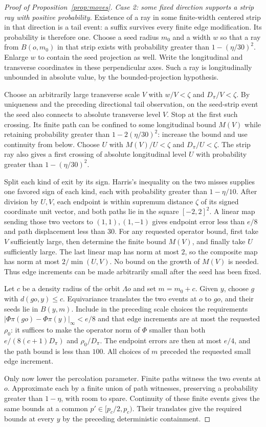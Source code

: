 \documentclass[11pt]{article}
\theoremstyle{definition}
\begin{document}
\begin{proof}[Proof of Proposition~\ref{prop:moves}]
\emph{Case 2: some fixed direction supports a strip ray with positive
probability.} Existence of a ray in some finite-width centered strip
in that direction is a tail event: a suffix survives every finite
edge modification. Its probability is therefore one. Choose a seed
radius $m_0$ and a width $w$ so that a ray from $B(o,m_0)$ in that
strip exists with probability greater than $1-(\eta/30)^2$.
Enlarge $w$ to contain the seed projection as well. Write the
longitudinal and transverse coordinates in these perpendicular axes.
Such a ray is longitudinally unbounded in absolute value, by the
bounded-projection hypothesis.

Choose an arbitrarily large transverse scale $V$ with
$w/V<\zeta$ and $D_\pi/V<\zeta$.
By uniqueness and the preceding directional tail observation, on
the seed-strip event the seed also connects to absolute transverse
level $V$. Stop at the first such crossing. Its finite path can be
confined to some longitudinal bound $M(V)$ while retaining probability
greater than $1-2(\eta/30)^2$: increase the bound and use continuity
from below. Choose $U$ with $M(V)/U<\zeta$ and $D_\pi/U<\zeta$.
The strip ray also gives a
first crossing of absolute longitudinal level $U$ with probability
greater than $1-(\eta/30)^2$.

Split each kind of exit by its sign. Harris's inequality on the two
misses supplies one favored sign of each kind, each with probability
greater than $1-\eta/10$. After division by $U,V$, each endpoint is
within supremum distance $\zeta$ of its signed coordinate unit vector,
and both paths lie in the square $[-2,2]^2$.
A linear map sending those two vectors to $(1,1),(1,-1)$ gives
endpoint error less than $e/8$ and path displacement less than $30$.
For any requested operator bound, first take $V$ sufficiently large,
then determine the finite bound $M(V)$, and finally take $U$ sufficiently
large. The last linear map has norm at most $2$, so the composite map
has norm at most $2/\min(U,V)$. No bound on the growth of $M(V)$ is
needed. Thus edge increments can be made arbitrarily small after
the seed has been fixed.

Let $c$ be a density radius of the orbit $\Lambda o$ and set
$m=m_0+c$. Given $y$, choose $g$ with $d(go,y)\le c$.
Equivariance translates the two events at $o$ to $go$, and their seeds
lie in $B(y,m)$. Include in the preceding scale choices the requirements
$|\Phi\pi(go)-\Phi\pi(y)|_\infty<e/8$ and that edge increments
are at most the requested $\rho_0$: it suffices to make the operator norm
of $\Phi$ smaller than both $e/(8(c+1)D_\pi)$ and $\rho_0/D_\pi$.
The endpoint errors are then at
most $e/4$, and the path bound is less than $100$. All choices of
$m$ preceded the requested small edge increment.

Only now lower the percolation parameter. Finite paths witness the
two events at $o$. Approximate each by a finite union of path witnesses,
preserving a probability greater than $1-\eta$, with room to spare.
Continuity of these finite events gives the same bounds at a common
$p'\in[p_c/2,p_c)$. Their translates give the required bounds at
every $y$ by the preceding deterministic containment.
\end{proof}
\end{document}
